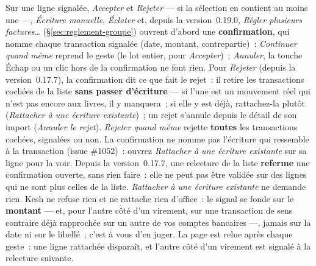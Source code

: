 \documentclass[a4paper,11pt,oneside]{article}
\begin{document}
Sur une ligne signalée, \emph{Accepter} et \emph{Rejeter} --- si la sélection en contient au moins une ---, \emph{Écriture manuelle}, \emph{Éclater} et, depuis la version~0.19.0, \emph{Régler plusieurs factures\ldots} (\S\ref{sec:reglement-groupe}) ouvrent d'abord une \textbf{confirmation}, qui nomme chaque transaction signalée (date, montant, contrepartie)~: \emph{Continuer quand même} reprend le geste (le lot entier, pour \emph{Accepter})~; \emph{Annuler}, la touche Échap ou un clic hors de la confirmation ne font rien. Pour \emph{Rejeter} (depuis la version~0.17.7), la confirmation dit ce que fait le rejet~: il retire les transactions cochées de la liste \textbf{sans passer d'écriture} --- si l'une est un mouvement réel qui n'est pas encore aux livres, il y manquera~; si elle y est déjà, rattachez-la plutôt (\emph{Rattacher à une écriture existante})~; un rejet s'annule depuis le détail de son import (\emph{Annuler le rejet}). \emph{Rejeter quand même} rejette \textbf{toutes} les transactions cochées, signalées ou non. La confirmation ne nomme pas l'écriture qui ressemble à la transaction (issue \#1052)~: ouvrez \emph{Rattacher à une écriture existante} sur sa ligne pour la voir. Depuis la version~0.17.7, une relecture de la liste \textbf{referme} une confirmation ouverte, sans rien faire~: elle ne peut pas être validée sur des lignes qui ne sont plus celles de la liste. \emph{Rattacher à une écriture existante} ne demande rien. Kesh ne refuse rien et ne rattache rien d'office~: le signal se fonde sur le \textbf{montant} --- et, pour l'autre côté d'un virement, sur une transaction de sens contraire déjà rapprochée sur un autre de vos comptes bancaires ---, jamais sur la date ni sur le libellé~; c'est à vous d'en juger. La page est relue après chaque geste~: une ligne rattachée disparaît, et l'autre côté d'un virement est signalé à la relecture suivante.
\end{document}
